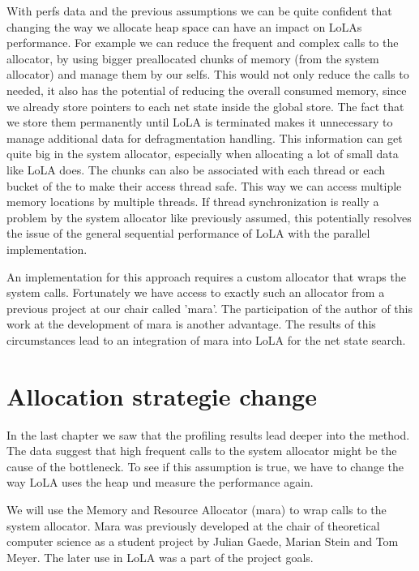 With perfs data and the previous assumptions we can be quite confident that changing the way we allocate heap space can have an impact on LoLAs performance. For example we can reduce the frequent and complex calls to the allocator, by using bigger preallocated chunks of memory (from the system allocator) and manage them by our selfs. This would not only reduce the calls to  needed, it also has the potential of reducing the overall consumed memory, since we already store pointers to each net state inside the global store. The fact that we store them permanently until LoLA is terminated makes it unnecessary to manage additional data for defragmentation handling. This information can get quite big in the system allocator, especially when allocating a lot of small data like LoLA does. The chunks can also be associated with each thread or each bucket of the  to make their access thread safe. This way we can access multiple memory locations by multiple threads. If thread synchronization is really a problem by the system allocator like previously assumed, this potentially resolves the issue of the general sequential performance of LoLA with the parallel implementation.

An implementation for this approach requires a custom allocator that wraps the system calls. Fortunately we have access to exactly such an allocator from a previous project at our chair called 'mara'. The participation of the author of this work at the development of mara is another advantage. The results of this circumstances lead to an integration of mara into LoLA for the net state search.

\section{Allocation strategie change}
In the last chapter we saw that the profiling results lead deeper into the  method. The data suggest that high frequent calls to the system allocator might be the cause of the bottleneck. To see if this assumption is true, we have to change the way LoLA uses the heap und measure the performance again.

We will use the Memory and Resource Allocator (mara) to wrap calls to the system allocator. Mara was previously developed at the chair of theoretical computer science as a student project by Julian Gaede, Marian Stein and Tom Meyer. The later use in LoLA was a part of the project goals.

